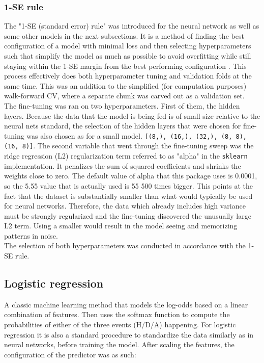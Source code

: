 \documentclass{article}
\begin{document}
\subsubsection{1-SE rule}
The "1-SE (standard error) rule" was introduced for the neural network as well as some other models in the next subsections. It is a method of finding the best configuration of a model with minimal loss and then selecting hyperparameters such that simplify the model as much as possible to avoid overfitting while still staying within the 1-SE margin from the best performing configuration \cite{HastieTibshiraniFriedman2009ESL}. This process effectively does both hyperparameter tuning and validation folds at the same time. This was an addition to the simplified (for computation purposes) walk-forward CV, where a separate chunk was carved out as a validation set. 
\\
The fine-tuning was ran on two hyperparameters. 
First of them, the hidden layers. Because the data that the model is being fed is of small size relative to the neural nets standard, the selection of the hidden layers that were chosen for fine-tuning was also chosen as for a small model. \texttt{[(8,), (16,), (32,), (8, 8), (16, 8)]}. 
The second variable that went through the fine-tuning sweep was the ridge regression (L2) regularization term referred to as "alpha" in the \texttt{sklearn} implementation. It penalizes the sum of squared coefficients and shrinks the weights close to zero. The default value of alpha that this package uses is 0.0001, so the 5.55 value that is actually used is 55 500 times bigger. This points at the fact that the dataset is substantially smaller than what would typically be used for neural networks. Therefore, the data which already includes high variance must be strongly regularized and the fine-tuning discovered the unusually large L2 term. Using a smaller would result in the model seeing and memorizing patterns in noise.
\\
The selection of both hyperparameters was conducted in accordance with the 1-SE rule.



\subsection{Logistic regression}
A classic machine learning method that models the log-odds based on a linear combination of features. Then uses the softmax function to compute the probabilities of either of the three events (H/D/A) happening. For logistic regression it is also a standard procedure to standardize the data similarly as in neural networks, before training the model. After scaling the features, the configuration of the predictor was as such:
\end{document}
